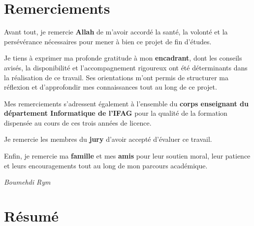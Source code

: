 \documentclass[12pt, a4paper, twoside, openany]{report}
\begin{document}
\clearpage
\thispagestyle{empty}
\chapter*{Remerciements}

Avant tout, je remercie \textbf{Allah} de m'avoir accord\'e la sant\'e, la volont\'e et la
pers\'ev\'erance n\'ecessaires pour mener \`a bien ce projet de fin d'\'etudes.

Je tiens \`a exprimer ma profonde gratitude \`a mon \textbf{encadrant}, dont les conseils
avis\'es, la disponibilit\'e et l'accompagnement rigoureux ont \'et\'e d\'eterminants dans
la r\'ealisation de ce travail. Ses orientations m'ont permis de structurer ma r\'eflexion
et d'approfondir mes connaissances tout au long de ce projet.

Mes remerciements s'adressent \'egalement \`a l'ensemble du \textbf{corps enseignant du
d\'epartement Informatique de l'IFAG} pour la qualit\'e de la formation dispens\'ee au
cours de ces trois ann\'ees de licence.

Je remercie les membres du \textbf{jury} d'avoir accept\'e d'\'evaluer ce travail.

Enfin, je remercie ma \textbf{famille} et mes \textbf{amis} pour leur soutien moral,
leur patience et leurs encouragements tout au long de mon parcours acad\'emique.

\vspace{1cm}
\hfill\textit{Boumehdi Rym}

\clearpage
\chapter*{R\'esum\'e}
\end{document}
